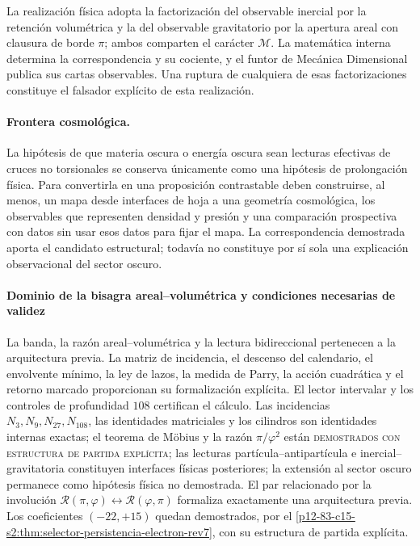 La realización física adopta la factorización del observable inercial por la
retención volumétrica y la del observable gravitatorio por la apertura areal
con clausura de borde \(\pi\); ambos comparten el carácter \(\mathcal M\). La
matemática interna determina la correspondencia y su cociente, y el funtor de
Mecánica Dimensional publica sus cartas observables. Una ruptura de cualquiera
de esas factorizaciones constituye el falsador explícito de esta realización.

\paragraph{Frontera cosmológica.}
La hipótesis de que materia oscura o energía oscura sean lecturas efectivas
de cruces no torsionales se conserva únicamente como
una hipótesis de prolongación física. Para convertirla en una proposición
contrastable
deben construirse, al menos, un mapa desde interfaces de hoja a una
geometría cosmológica, los observables que representen densidad y presión y
una comparación prospectiva con datos sin usar esos datos para fijar el
mapa. La correspondencia demostrada aporta el candidato estructural; todavía no
constituye por sí sola una explicación observacional del sector oscuro.

\paragraph{Dominio de la bisagra areal–volumétrica y condiciones necesarias de validez}
La banda, la razón areal--volumétrica y la lectura bidireccional pertenecen a
la arquitectura previa. La matriz de incidencia, el descenso del calendario,
el envolvente mínimo, la ley de lazos, la medida de Parry, la acción
cuadrática y el retorno marcado proporcionan su formalización explícita. El
lector intervalar y los controles de profundidad \(108\) certifican el
cálculo. Las incidencias \(N_3,N_9,N_{27},N_{108}\), las identidades
matriciales y los cilindros son identidades internas exactas; el teorema de
Möbius y la razón
\(\pi/\varphi^2\) están
\textsc{demostrados con estructura de partida explícita}; las lecturas
partícula--antipartícula e inercial--gravitatoria constituyen interfaces
físicas posteriores; la extensión al sector oscuro permanece como
hipótesis física no demostrada. El par relacionado por la involución
\(\mathscr R(\pi,\varphi)\leftrightarrow
\mathscr R(\varphi,\pi)\) formaliza exactamente una arquitectura previa. Los
coeficientes \((-22,+15)\) quedan demostrados, por el
\cref{p12-83-c15-s2:thm:selector-persistencia-electron-rev7}, con su estructura de partida
explícita.

